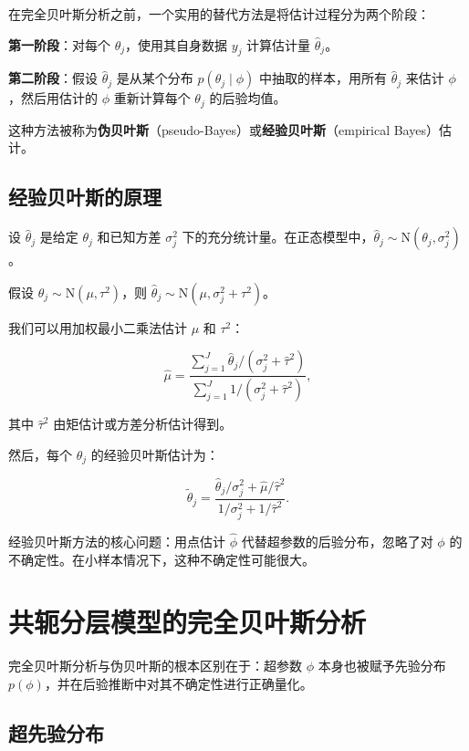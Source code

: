 在完全贝叶斯分析之前，一个实用的替代方法是将估计过程分为两个阶段：

\textbf{第一阶段}：对每个 $\theta_j$，使用其自身数据 $y_j$ 计算估计量 $\hat{\theta}_j$。

\textbf{第二阶段}：假设 $\hat{\theta}_j$ 是从某个分布 $p(\theta_j \mid \phi)$ 中抽取的样本，用所有 $\hat{\theta}_j$ 来估计 $\phi$，然后用估计的 $\phi$ 重新计算每个 $\theta_j$ 的后验均值。

这种方法被称为\textbf{伪贝叶斯}（pseudo-Bayes）或\textbf{经验贝叶斯}（empirical Bayes）估计。

\subsection{经验贝叶斯的原理}

设 $\hat{\theta}_j$ 是给定 $\theta_j$ 和已知方差 $\sigma_j^2$ 下的充分统计量。在正态模型中，$\hat{\theta}_j \sim \mathrm{N}(\theta_j, \sigma_j^2)$。

假设 $\theta_j \sim \mathrm{N}(\mu, \tau^2)$，则 $\hat{\theta}_j \sim \mathrm{N}(\mu, \sigma_j^2 + \tau^2)$。

我们可以用加权最小二乘法估计 $\mu$ 和 $\tau^2$：

\[
\hat{\mu} = \frac{\sum_{j=1}^{J} \hat{\theta}_j / (\sigma_j^2 + \hat{\tau}^2)}{\sum_{j=1}^{J} 1 / (\sigma_j^2 + \hat{\tau}^2)}, \label{eq:eb-mu-estimate}
\]

其中 $\hat{\tau}^2$ 由矩估计或方差分析估计得到。

然后，每个 $\theta_j$ 的经验贝叶斯估计为：

\[
\tilde{\theta}_j = \frac{\hat{\theta}_j / \sigma_j^2 + \hat{\mu} / \hat{\tau}^2}{1 / \sigma_j^2 + 1 / \hat{\tau}^2}. \label{eq:eb-theta-estimate}
\]

\begin{Remark}
  经验贝叶斯方法的核心问题：用点估计 $\hat{\phi}$ 代替超参数的后验分布，忽略了对 $\phi$ 的不确定性。在小样本情况下，这种不确定性可能很大。
\end{Remark}

\section{共轭分层模型的完全贝叶斯分析}

完全贝叶斯分析与伪贝叶斯的根本区别在于：超参数 $\phi$ 本身也被赋予先验分布 $p(\phi)$，并在后验推断中对其不确定性进行正确量化。

\subsection{超先验分布}

